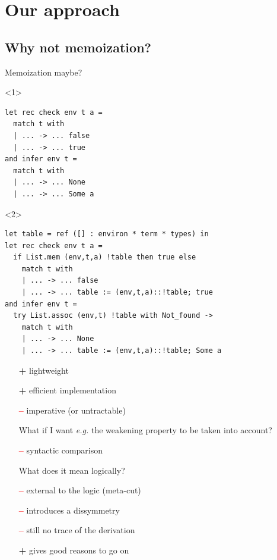 \documentclass[ignorenonframetext,red]{beamer}
\newcommand\To{\Rightarrow}
\newcommand\itplus{\textcolor{green!60!black}{\textbf{\textsf{+}}}}
\newcommand\itminus{\textcolor{red}{\textbf{\textsf{--}}}}
\begin{document}
\section{Our approach}

\subsection{Why not memoization?}

\begin{frame}[fragile]{Memoization maybe?}
  \begin{onlyenv}<1>
\begin{lstlisting}
let rec check env t a = 
  match t with
  | ... -> ... false
  | ... -> ... true
and infer env t =
  match t with 
  | ... -> ... None
  | ... -> ... Some a
\end{lstlisting}
  \end{onlyenv}
  \begin{onlyenv}<2>
\begin{lstlisting}
let table = ref ([] : environ * term * types) in
let rec check env t a = 
  if List.mem (env,t,a) !table then true else
    match t with
    | ... -> ... false
    | ... -> ... table := (env,t,a)::!table; true
and infer env t =
  try List.assoc (env,t) !table with Not_found ->
    match t with 
    | ... -> ... None
    | ... -> ... table := (env,t,a)::!table; Some a
\end{lstlisting}
  \end{onlyenv}
  \pause\pause
  \begin{enumerate}[<+->]
  \item[\itplus] lightweight
  \item[\itplus] efficient implementation
  \item[\itminus] imperative (or untractable)
  \item[] \footnotesize What if I want \emph{e.g.} the weakening property to be taken into account?
  \item [\itminus] syntactic comparison
  \item[] \footnotesize What does it mean logically?
  \item[\itminus] external to the logic (meta-cut)
  \item[\itminus] introduces a dissymmetry
  \item[\itminus] still no trace of the derivation
  \item[\itplus] gives good reasons to go on
  \end{enumerate}
\end{frame}
\end{document}
